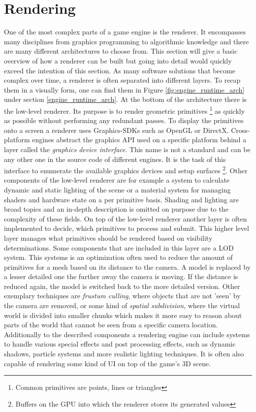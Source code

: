 \section{Rendering}

One of the most complex parts of a game engine is the renderer. It encompasses many disciplines from graphics programming to algorithmic knowledge and there are many different architectures to choose from. This section will give a basic overview of how a renderer can be built but going into detail would quickly exceed the intention of this section. 
As many software solutions that become complex over time, a renderer is often separated into different layers. To recap them in a visually form, one can find them in Figure \ref{fig:engine_runtime_arch} under section \ref{engine_runtime_arch}. At the bottom of the architecture there is the low-level renderer. Its purpose is to render geometric primitives \footnote{Common primitives are points, lines or triangles} as quickly as possible without performing any redundant passes. To display the primitives onto a screen a renderer uses Graphics-\acp{SDK} such as OpenGL or DirectX. Cross-platform engines abstract the graphics \ac{API} used on a specific platform behind a layer called the \textit{graphics device interface}. This name is not a standard and can be any other one in the source code of different engines. It is the task of this interface to enumerate the available graphics devices and setup surfaces \footnote{Buffers on the \ac{GPU} into which the renderer stores its generated values}. Other components of the low-level renderer are for example a system to calculate dynamic and static lighting of the scene or a material system for managing shaders and hardware state on a per primitive basis. Shading and lighting are broad topics and an in-depth description is omitted on purpose due to the complexity of these fields. 
On top of the low-level renderer another layer is often implemented to decide, which primitives to process and submit. This higher level layer manages what primitives should be rendered based on visibility determinations. Some components that are included in this layer are a \ac{LOD} system. This systems is an optimization often used to reduce the amount of primitives for a mesh based on its distance to the camera. A model is replaced by a lesser detailed one the further away the camera is moving. If the distance is reduced again, the model is switched back to the more detailed version. Other exemplary techniques are \textit{frustum culling}, where objects that are not 'seen' by the camera are removed, or some kind of \textit{spatial subdivision}, where the virtual world is divided into smaller chunks which makes it more easy to reason about parts of the world that cannot be seen from a specific camera location.
Additionally to the described components a rendering engine can include systems to handle various special effects and post processing effects, such as dynamic shadows, particle systems and more realistic lighting techniques. It is often also capable of rendering some kind of \ac{UI} on top of the game's 3D scene. 

